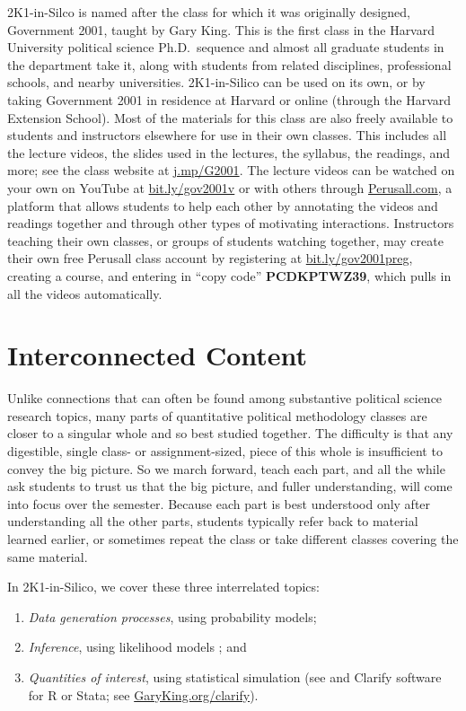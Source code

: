 \documentclass[12pt]{article}
\theoremstyle{definition}
\begin{document}
2K1-in-Silco is named after the class for which it was originally designed, Government 2001, taught by Gary King. This is the first class in the Harvard University political science Ph.D.\ sequence and almost all graduate students in the department take it, along with students from related disciplines, professional schools, and nearby universities. 2K1-in-Silico can be used on its own, or by taking Government 2001 in residence at Harvard or online (through the Harvard Extension School).  Most of the materials for this class are also freely available to students and instructors elsewhere for use in their own classes. This includes all the lecture videos, the slides used in the lectures, the syllabus, the readings, and more; see the class website at \href{https://j.mp/G2001}{j.mp/G2001}. The lecture videos can be watched on your own on YouTube at \href{https://bit.ly/gov2001v}{bit.ly/gov2001v} or with others through \href{https://perusall.com}{Perusall.com}, a platform that allows students to help each other by annotating the videos and readings together and through other types of motivating interactions. Instructors teaching their own classes, or groups of students watching together, may create their own free Perusall class account by registering at \href{https://bit.ly/gov2001preg}{bit.ly/gov2001preg}, creating a course, and entering in ``copy code'' \textbf{PCDKPTWZ39}, which pulls in all the videos automatically.

\section{Interconnected Content}

Unlike connections that can often be found among substantive political science research topics, many parts of quantitative political methodology classes are closer to a singular whole and so best studied together. The difficulty is that any digestible, single class- or assignment-sized, piece of this whole is insufficient to convey the big picture. So we march forward, teach each part, and all the while ask students to trust us that the big picture, and fuller understanding, will come into focus over the semester. Because each part is best understood only after understanding all the other parts, students typically refer back to material learned earlier, or sometimes repeat the class or take different classes covering the same material.

In 2K1-in-Silico, we cover these three interrelated topics:
\begin{enumerate}\singlespacing
  \item \emph{Data generation processes}, using probability models;
  \item \emph{Inference}, using likelihood models \citep{King98}; and
  \item \emph{Quantities of interest}, using statistical simulation (see \citealt{KinTomWit00} and Clarify software for R or Stata; see \href{https://GaryKing.org/clarify}{GaryKing.org/clarify}).
\end{enumerate}
\end{document}
